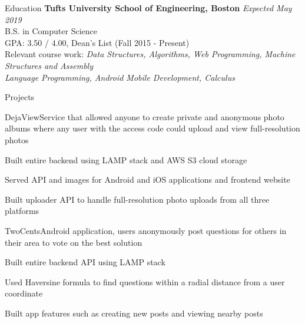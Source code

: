 \documentclass{resume}
\begin{document}
  \begin{rSection}{Education}
    {\bf Tufts University School of Engineering, Boston} \hfill {\em Expected May 2019} \\ 
    { B.S. in Computer Science} \\
    GPA: 3.50 / 4.00, Dean's List (Fall 2015 - Present)\\
    Relevant course work: \textit{Data Structures, Algorithms, Web Programming, Machine Structures and Assembly\\ Language Programming, Android Mobile Development, Calculus}
  \end{rSection}
  
  \begin{rSection}{Projects}
  
  \begin{rSubsection}{DejaView}{}{\normalfont Service that allowed anyone to create private and anonymous photo albums where any user with the access code could upload and view full-resolution photos}{}
  \item Built entire backend using LAMP stack and AWS S3 cloud storage
  \item Served API and images for Android and iOS applications and frontend website
  \item Built uploader API to handle full-resolution photo uploads from all three platforms
  \end{rSubsection}
  
  \begin{rSubsection}{TwoCents}{}{\normalfont Android application, users anonymously post questions for others in their area to vote on the best solution}{}
    \item Built entire backend API using LAMP stack  
    \item Used Haversine formula to find questions within a radial distance from a user coordinate
    \item Built app features such as creating new posts and viewing nearby posts
  \end{rSubsection}
   
  \end{rSection}
  
\end{document}
